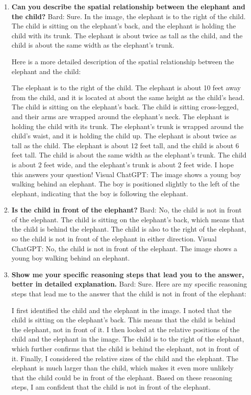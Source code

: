     \begin{enumerate}
        \item \textbf{Can you describe the spatial relationship between the elephant and the child?}
        \subitem Bard:
        Sure. In the image, the elephant is to the right of the child. The child is sitting on the elephant's back, and the elephant is holding the child with its trunk. The elephant is about twice as tall as the child, and the child is about the same width as the elephant's trunk.
        
        Here is a more detailed description of the spatial relationship between the elephant and the child:
        
        The elephant is to the right of the child. The elephant is about 10 feet away from the child, and it is located at about the same height as the child's head.
        The child is sitting on the elephant's back. The child is sitting cross-legged, and their arms are wrapped around the elephant's neck.
        The elephant is holding the child with its trunk. The elephant's trunk is wrapped around the child's waist, and it is holding the child up.
        The elephant is about twice as tall as the child. The elephant is about 12 feet tall, and the child is about 6 feet tall.
        The child is about the same width as the elephant's trunk. The child is about 2 feet wide, and the elephant's trunk is about 2 feet wide.
        I hope this answers your question!
        \subitem Visual ChatGPT: The image shows a young boy walking behind an elephant. The boy is positioned slightly to the left of the elephant, indicating that the boy is following the elephant.
        \item \textbf{Is the child in front of the elephant?}
        \subitem Bard: 
        No, the child is not in front of the elephant. The child is sitting on the elephant's back, which means that the child is behind the elephant. The child is also to the right of the elephant, so the child is not in front of the elephant in either direction.
        \subitem Visual ChatGPT: No, the child is not in front of the elephant. The image shows a young boy walking behind an elephant.
        \item \textbf{Show me your specific reasoning steps that lead you to the answer, better in detailed explanation.}
        \subitem Bard:
        Sure. Here are my specific reasoning steps that lead me to the answer that the child is not in front of the elephant:

        I first identified the child and the elephant in the image.
        I noted that the child is sitting on the elephant's back. This means that the child is behind the elephant, not in front of it.
        I then looked at the relative positions of the child and the elephant in the image. The child is to the right of the elephant, which further confirms that the child is behind the elephant, not in front of it.
        Finally, I considered the relative sizes of the child and the elephant. The elephant is much larger than the child, which makes it even more unlikely that the child could be in front of the elephant.
        Based on these reasoning steps, I am confident that the child is not in front of the elephant.


\end{enumerate}
